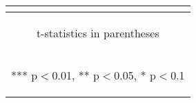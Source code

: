 \documentclass[border=0.2cm]{standalone}
\begin{document}
\begin{tabular}{lcccccc}
    \vspace{2pt}           & \begin{footnotesize}\end{footnotesize}         & \begin{footnotesize}\end{footnotesize}         & \begin{footnotesize}\end{footnotesize}         & \begin{footnotesize}\end{footnotesize}          & \begin{footnotesize}\end{footnotesize}         & \begin{footnotesize}\end{footnotesize}         \\
    \bottomrule
    \multicolumn{7}{c}{\begin{footnotesize} t-statistics in parentheses\end{footnotesize}}                                                                                                                                                                                                                                        \\
    \multicolumn{7}{c}{\begin{footnotesize} *** p$<$0.01, ** p$<$0.05, * p$<$0.1\end{footnotesize}}                                                                                                                                                                                                                               \\
\end{tabular}
\end{document}
